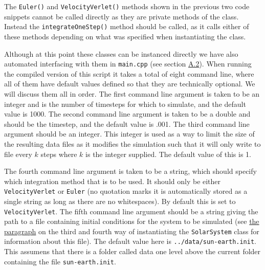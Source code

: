 \documentclass[reprint,english,notitlepage]{revtex4-1}  %
\begin{document}
The \verb+Euler()+ and \verb+VelocityVerlet()+ methods shown in the previous two code snippets cannot be called directly as they are private methods of the class. Instead the \verb+integrateOneStep()+ method should be called, as it calls either of these methods depending on what was specified when instantiating the class.

Although at this point these classes can be instanced directly we have also automated interfacing with them in \verb+main.cpp+ (see section \hyperref[A.2]{A.2}). When running the compiled version of this script it takes a total of eight command line, where all of them have default values defined so that they are technically optional. We will discuss them all in order. The first command line argument is taken to be an integer and is the number of timesteps for which to simulate, and the default value is 1000. The second command line argument is taken to be a double and should be the timestep, and the default value is .001. The third command line argument should be an integer. This integer is used as a way to limit the size of the resulting data files as it modifies the simulation such that it will only write to file every $k$ steps where $k$ is the integer supplied. The default value of this is 1. 

The fourth command line argument is taken to be a string, which should specify which integration method that is to be used. It should only be either \verb+VelocityVerlet+ or \verb+Euler+ (no quotation marks it is automatically stored as a single string as long as there are no whitespaces). By default this is set to \verb+VelocityVerlet+. The fifth command line argument should be a string giving the path to a file containing initial conditions for the system to be simulated (see \hyperref[poi:initfile]{the paragraph} on the third and fourth way of instantiating the \verb+SolarSystem+ class for information about this file). The default value here is \verb+../data/sun-earth.init+. This assumens that there is a folder called data one level above the current folder containing the file \verb+sun-earth.init+. 
\end{document}
